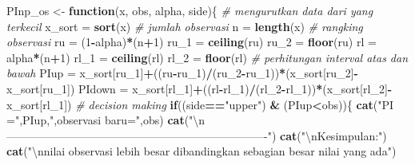 \documentclass[]{book}
\newenvironment{Shaded}{\begin{snugshade}}{\end{snugshade}}
\newcommand{\KeywordTok}[1]{\textcolor[rgb]{0.13,0.29,0.53}{\textbf{#1}}}
\newcommand{\DecValTok}[1]{\textcolor[rgb]{0.00,0.00,0.81}{#1}}
\newcommand{\CharTok}[1]{\textcolor[rgb]{0.31,0.60,0.02}{#1}}
\newcommand{\StringTok}[1]{\textcolor[rgb]{0.31,0.60,0.02}{#1}}
\newcommand{\CommentTok}[1]{\textcolor[rgb]{0.56,0.35,0.01}{\textit{#1}}}
\newcommand{\ControlFlowTok}[1]{\textcolor[rgb]{0.13,0.29,0.53}{\textbf{#1}}}
\newcommand{\OperatorTok}[1]{\textcolor[rgb]{0.81,0.36,0.00}{\textbf{#1}}}
\newcommand{\NormalTok}[1]{#1}
\begin{document}
\begin{Shaded}
\begin{Highlighting}[]
\NormalTok{PInp_os <-}\StringTok{ }\ControlFlowTok{function}\NormalTok{(x, obs, alpha, side)\{}
  \CommentTok{# mengurutkan data dari yang terkecil}
\NormalTok{  x_sort =}\StringTok{ }\KeywordTok{sort}\NormalTok{(x)}
  \CommentTok{# jumlah observasi}
\NormalTok{  n =}\StringTok{ }\KeywordTok{length}\NormalTok{(x)}
  \CommentTok{# rangking observasi}
\NormalTok{  ru =}\StringTok{ }\NormalTok{(}\DecValTok{1}\OperatorTok{-}\NormalTok{alpha)}\OperatorTok{*}\NormalTok{(n}\OperatorTok{+}\DecValTok{1}\NormalTok{)}
\NormalTok{  ru_}\DecValTok{1}\NormalTok{ =}\StringTok{ }\KeywordTok{ceiling}\NormalTok{(ru)}
\NormalTok{  ru_}\DecValTok{2}\NormalTok{ =}\StringTok{ }\KeywordTok{floor}\NormalTok{(ru)}
\NormalTok{  rl =}\StringTok{ }\NormalTok{alpha}\OperatorTok{*}\NormalTok{(n}\OperatorTok{+}\DecValTok{1}\NormalTok{)}
\NormalTok{  rl_}\DecValTok{1}\NormalTok{ =}\StringTok{ }\KeywordTok{ceiling}\NormalTok{(rl)}
\NormalTok{  rl_}\DecValTok{2}\NormalTok{ =}\StringTok{ }\KeywordTok{floor}\NormalTok{(rl)}
  \CommentTok{# perhitungan interval atas dan bawah}
\NormalTok{  PIup =}\StringTok{ }\NormalTok{x_sort[ru_}\DecValTok{1}\NormalTok{]}\OperatorTok{+}\NormalTok{((ru}\OperatorTok{-}\NormalTok{ru_}\DecValTok{1}\NormalTok{)}\OperatorTok{/}\NormalTok{(ru_}\DecValTok{2}\OperatorTok{-}\NormalTok{ru_}\DecValTok{1}\NormalTok{))}\OperatorTok{*}\NormalTok{(x_sort[ru_}\DecValTok{2}\NormalTok{]}\OperatorTok{-}\NormalTok{x_sort[ru_}\DecValTok{1}\NormalTok{])}
\NormalTok{  PIdown =}\StringTok{ }\NormalTok{x_sort[rl_}\DecValTok{1}\NormalTok{]}\OperatorTok{+}\NormalTok{((rl}\OperatorTok{-}\NormalTok{rl_}\DecValTok{1}\NormalTok{)}\OperatorTok{/}\NormalTok{(rl_}\DecValTok{2}\OperatorTok{-}\NormalTok{rl_}\DecValTok{1}\NormalTok{))}\OperatorTok{*}\NormalTok{(x_sort[rl_}\DecValTok{2}\NormalTok{]}\OperatorTok{-}\NormalTok{x_sort[rl_}\DecValTok{1}\NormalTok{])}
  \CommentTok{# decision making}
  \ControlFlowTok{if}\NormalTok{((side}\OperatorTok{==}\StringTok{"upper"}\NormalTok{) }\OperatorTok{&}\StringTok{ }\NormalTok{(PIup}\OperatorTok{<}\NormalTok{obs))\{}
    \KeywordTok{cat}\NormalTok{(}\StringTok{"PI ="}\NormalTok{,PIup,}\StringTok{",observasi baru="}\NormalTok{,obs)}
    \KeywordTok{cat}\NormalTok{(}\StringTok{"}\CharTok{\textbackslash{}n}\StringTok{----------------------------------------------------------------------"}\NormalTok{)}
    \KeywordTok{cat}\NormalTok{(}\StringTok{"}\CharTok{\textbackslash{}n}\StringTok{Kesimpulan:"}\NormalTok{)}
    \KeywordTok{cat}\NormalTok{(}\StringTok{"}\CharTok{\textbackslash{}n}\StringTok{nilai observasi lebih besar dibandingkan sebagian besar nilai yang ada"}\NormalTok{)}

\end{Highlighting}
\end{Shaded}
\end{document}
